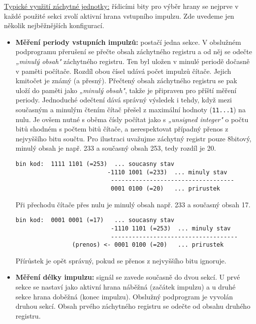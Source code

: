         \underline{Typické využití záchytné jednotky:}
        řídicími bity pro výběr hrany se nejprve v každé použité sekci zvolí aktivní hrana 
        vstupního impulzu. Zde uvedeme jen několik nejběžnějších konfigurací.
        \begin{itemize}\addtolength{\itemsep}{-0.5\baselineskip}
          \item \textbf{Měření periody vstupních impulzů:} postačí jedna sekce. V obslužném  
                podprogramu přerušení se přečte obsah záchytného registru a od něj se odečte 
                \emph{„minulý obsah"} záchytného registru. Ten byl uložen v minulé periodě dočasně 
                v paměti počítače. Rozdíl obou čísel udává počet impulzů čítače. Jejich kmitočet je 
                známý (a přesný). Přečtený obsah záchytného registru se pak uloží do paměti jako 
                \emph{„minulý obsah"}, takže je připraven pro příští měření periody. Jednoduché 
                odečtení dává správný výsledek i tehdy, když mezi současným a minulým čtením čítač 
                přešel z maximální hodnoty (\texttt{11...1}) na nulu. Je ovšem nutné s oběma čísly 
                počítat jako s \emph{„unsigned integer"} o počtu bitů shodném s počtem bitů čítače, 
                a nerespektovat případný přenos z nejvyššího bitu součtu. Pro ilustraci uvažujme 
                záchytný registr pouze 8bitový, minulý obsah je např. 233 a současný obsah 253, 
                tedy rozdíl je 20.
                \lstset{numbers=none}
                \begin{lstlisting}[gobble=16]
                 bin kod:  1111 1101 (=253)  ... soucasny stav
                          -1110 1001 (=233)  ... minuly stav
                           -----------------------------------
                           0001 0100 (=20)   ... prirustek
                \end{lstlisting}
                Při přechodu čítače přes nulu je minulý obsah např. 233 a současný obsah 17.
                \begin{lstlisting}[gobble=16]
                  bin kod:  0001 0001 (=17)   ... soucasny stav
                           -1110 1101 (=253)  ... minuly stav
                           ------------------------------------
                (prenos) <- 0001 0100 (=20)   ... prirustek
                \end{lstlisting}
                Přírůstek je opět správný, pokud se přenos z nejvyššího bitu ignoruje.
                           
          \item \textbf{Měření délky impulzu:}  signál se zavede současně do dvou sekcí. U prvé  
                sekce se nastaví jako aktivní hrana náběžná (začátek impulzu) a u druhé sekce 
                hrana doběžná (konec impulzu). Obslužný podprogram je vyvolán druhou sekcí. Obsah 
                prvého záchytného registru se odečte od obsahu druhého registru.
          

\end{itemize}
